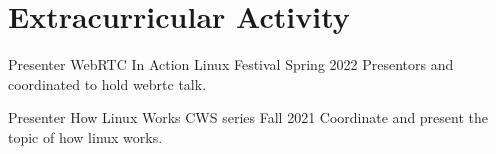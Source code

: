 \section{Extracurricular Activity}

\cventry%
  {Presenter}
  {WebRTC In Action}
  {}
  {Linux Festival}
  {Spring 2022}
  {%
      Presentors and coordinated to hold webrtc talk.
  }

\cventry%
  {Presenter}
  {How Linux Works}
  {}
  {CWS series}
  {Fall 2021}
  {%
      Coordinate and present the topic of how linux works.
  }
